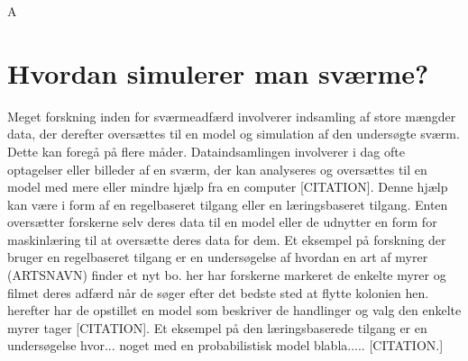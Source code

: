 A\section{Hvordan simulerer man sværme?} \label{ch:hvordansvaerme}
Meget forskning inden for sværmeadfærd involverer indsamling af store mængder data, der derefter oversættes til en model og simulation af den undersøgte sværm. Dette kan foregå på flere måder. Dataindsamlingen involverer i dag ofte optagelser eller billeder af en sværm, der kan analyseres og oversættes til en model med mere eller mindre hjælp fra en computer [CITATION]. Denne hjælp kan være i form af en  regelbaseret tilgang eller en læringsbaseret tilgang. Enten oversætter forskerne selv deres data til en model eller de udnytter en form for maskinlæring til at oversætte deres data for dem. Et eksempel på forskning der bruger en regelbaseret tilgang er en undersøgelse af hvordan en art af myrer (ARTSNAVN) finder et nyt bo. her har forskerne markeret de enkelte myrer og filmet deres adfærd når de søger efter det bedste sted at flytte kolonien hen. herefter har de opstillet en model som beskriver de handlinger og valg den enkelte myrer tager [CITATION].
Et eksempel på den læringsbaserede tilgang er en undersøgelse hvor... noget med en probabilistisk model blabla..... [CITATION.]




